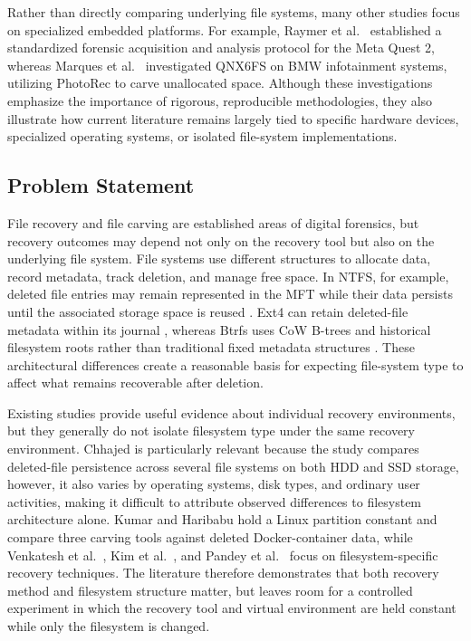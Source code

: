\documentclass[conference]{IEEEtran}
\begin{document}
Rather than directly comparing underlying file systems, many other studies focus on specialized embedded platforms. For example, Raymer et al.\ \cite{raymer2023quest2} established a standardized forensic acquisition and analysis protocol for the Meta Quest 2, whereas Marques et al.\ \cite{marques2026bmw} investigated QNX6FS on BMW infotainment systems, utilizing PhotoRec to carve unallocated space. Although these investigations emphasize the importance of rigorous, reproducible methodologies, they also illustrate how current literature remains largely tied to specific hardware devices, specialized operating systems, or isolated file-system implementations.

\subsection{Problem Statement}

File recovery and file carving are established areas of digital forensics, but recovery outcomes may depend not only on the recovery tool but also on the underlying file system. File systems use different structures to allocate data, record metadata, track deletion, and manage free space. In NTFS, for example, deleted file entries may remain represented in the MFT while their data persists until the associated storage space is reused \cite{venkatesh2024ntfs}. Ext4 can retain deleted-file metadata within its journal \cite{kim2021ext4xfs}, whereas Btrfs uses CoW B-trees and historical filesystem roots rather than traditional fixed metadata structures \cite{pandey2026btrfs}. These architectural differences create a reasonable basis for expecting file-system type to affect what remains recoverable after deletion.

Existing studies provide useful evidence about individual recovery environments, but they generally do not isolate filesystem type under the same recovery environment. Chhajed \cite{chhajed2024persistence} is particularly relevant because the study compares deleted-file persistence across several file systems on both HDD and SSD storage, however, it also varies by operating systems, disk types, and ordinary user activities, making it difficult to attribute observed differences to filesystem architecture alone. Kumar and Haribabu \cite{kumar2022docker} hold a Linux partition constant and compare three carving tools against deleted Docker-container data, while Venkatesh et al.\ \cite{venkatesh2024ntfs}, Kim et al.\ \cite{kim2021ext4xfs}, and Pandey et al.\ \cite{pandey2026btrfs} focus on filesystem-specific recovery techniques. The literature therefore demonstrates that both recovery method and filesystem structure matter, but leaves room for a controlled experiment in which the recovery tool and virtual environment are held constant while only the filesystem is changed.
\end{document}
